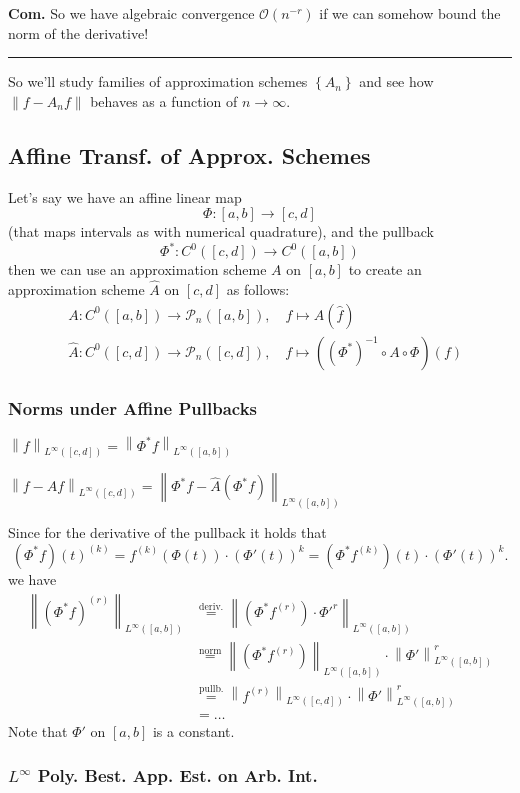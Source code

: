 \documentclass[a4paper,11pt]{extarticle}
\newcommand{\BigO}{\mathcal{O}}
\newcommand{\cP}{\mathcal{P}}
\newcommand{\set}[1]{\left\{ #1 \right\}}
\newcommand{\norm}[1]{\left\lVert #1 \right\rVert}
\newcommand{\whf}{\widehat{f}}
\newcommand{\whA}{\widehat{A}}
\newcommand{\Com}{\textbf{Com.} }
\newcommand{\sep}{\vspace{5pt}\noindent\hrule\vspace{5pt}}
\begin{document}
\begin{multicols*}{2}
\Com So we have algebraic convergence $\BigO(n^{-r})$ if we can somehow bound
the norm of the derivative!

\sep

So we'll study families of approximation schemes $\set{A_n}$ and see how
$
\norm{f-A_nf}
$
behaves as a function of $n\to\infty$.

\subsection{Affine Transf. of Approx. Schemes}

Let's say we have an affine linear map \[\Phi\colon [a,b]\to[c,d]\] (that maps
intervals as with numerical quadrature), and the pullback
\[
\Phi^*\colon C^0([c,d])\to C^0([a,b])
\] 
then we can use an approximation scheme $A$ on $[a,b]$ to create an
approximation scheme $\whA$ on $[c,d]$ as follows:
\begin{align*}
&A\colon C^0([a,b])\to\cP_n([a,b]), \quad f\mapsto A(\whf)
\\
&\whA\colon C^0([c,d])\to\cP_n([c,d]),\quad f\mapsto ((\Phi^*)^{-1}\circ
A\circ\Phi)(f)
\end{align*}

\subsubsection{Norms under Affine Pullbacks}

$
\norm{f}_{L^\infty([c,d])}
=\norm{\Phi^*f}_{L^\infty([a,b])}
$

$
\norm{f-Af}_{L^\infty([c,d])}
=\norm{\Phi^* f-\whA(\Phi^*f)}_{L^\infty([a,b])}
$

Since for the derivative of the pullback it holds that
\[
(\Phi^*f)(t)^{(k)}=
f^{(k)}(\Phi(t))\cdot(\Phi'(t))^k=
(\Phi^*f^{(k)})(t)\cdot(\Phi'(t))^k.
\]
we have
\begin{align*}
\norm{(\Phi^*f)^{(r)}}_{L^\infty([a,b])}
&\stackrel{\text{deriv.}}{=}\norm{\left(\Phi^*f^{(r)}\right)\cdot\Phi'^r}_{L^\infty([a,b])}\\
&\stackrel{\text{norm}}{=}\norm{\left(\Phi^*f^{(r)}\right)}_{L^\infty([a,b])}
\cdot\norm{\Phi'}_{L^\infty([a,b])}^r\\
&\stackrel{\text{pullb.}}{=}\norm{f^{(r)}}_{L^\infty([c,d])}
\cdot\norm{\Phi'}_{L^\infty([a,b])}^r\\
&=\ldots
\end{align*}
Note that $\Phi'$ on $[a,b]$ is a constant.

\subsubsection{$L^\infty$ Poly. Best. App. Est. on Arb. Int.}


\end{multicols*}
\end{document}
